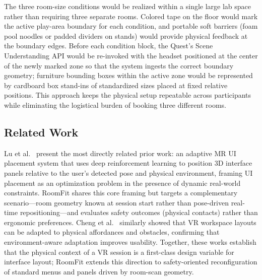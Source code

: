 \documentclass{styling/vgtc}                          %
\begin{document}
The three room-size conditions would be realized within a single large lab
space rather than requiring three separate rooms. Colored tape on the floor
would mark the active play-area boundary for each condition, and portable
soft barriers (foam pool noodles or padded dividers on stands) would provide
physical feedback at the boundary edges. Before each condition block, the
Quest's Scene Understanding API would be re-invoked with the headset
positioned at the center of the newly marked zone so that the system ingests
the correct boundary geometry; furniture bounding boxes within the active
zone would be represented by cardboard box stand-ins of standardized sizes
placed at fixed relative positions. This approach keeps the physical setup
repeatable across participants while eliminating the logistical burden of
booking three different rooms.

\subsection{Related Work}

Lu et al.~\cite{lu2024adaptive} present the most directly related prior
work: an adaptive MR UI placement system that uses deep reinforcement
learning to position 3D interface panels relative to the user's detected
pose and physical environment, framing UI placement as an optimization
problem in the presence of dynamic real-world constraints. RoomFit shares
this core framing but targets a complementary scenario---room geometry known
at session start rather than pose-driven real-time repositioning---and
evaluates safety outcomes (physical contacts) rather than ergonomic
preferences. Cheng et al.~\cite{cheng2023interactionadapt} similarly showed
that VR workspace layouts can be adapted to physical affordances and
obstacles, confirming that environment-aware adaptation improves usability.
Together, these works establish that the physical context of a VR session is
a first-class design variable for interface layout; RoomFit extends this
direction to safety-oriented reconfiguration of standard menus and panels
driven by room-scan geometry.





\end{document}
